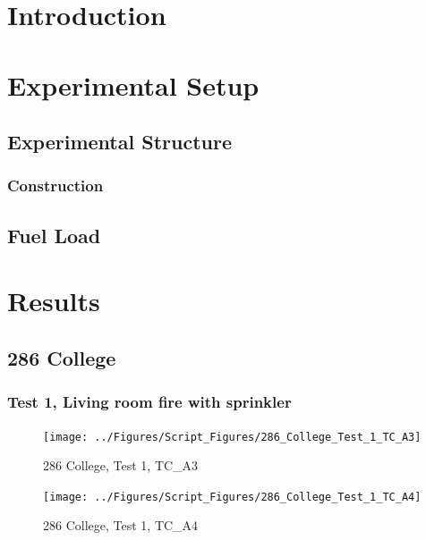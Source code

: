 \documentclass[12pt,oneside]{book}
\begin{document}
\mainmatter

\chapter{Introduction}
\label{chap:Introduction}

\chapter{Experimental Setup}
\label{chap:Experimental_Setup}

\section{Experimental Structure}
\label{sec:Experimental_Structure}

\subsection{Construction}
\label{sec:Construction}

\section{Fuel Load}

\chapter{Results}
\label{chap:Results}

\section{286 College}

\subsection{Test 1, Living room fire with sprinkler}

\begin{figure}[!ht]
\texttt{[image: ../Figures/Script\_Figures/286\_College\_Test\_1\_TC\_A3]}
\caption{286 College, Test 1, TC\_A3}
\label{fig:286_College_Test_1_TC_A3}
\end{figure}

\begin{figure}[!ht]
\texttt{[image: ../Figures/Script\_Figures/286\_College\_Test\_1\_TC\_A4]}
\caption{286 College, Test 1, TC\_A4}
\label{fig:286_College_Test_1_TC_A4}
\end{figure}
\end{document}
